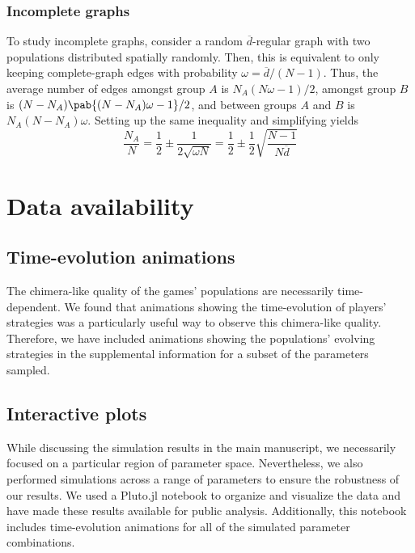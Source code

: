 \subsubsection{Incomplete graphs}\label{sec:two_unequal_groups_incomplete}
To study incomplete graphs,
consider a random $\overline{d}$-regular graph
with two populations distributed spatially randomly.
Then, this is equivalent to only keeping complete-graph edges
with probability $\omega = \overline{d}/(N-1)$.
Thus, the average number of edges
amongst group $A$ is $N_A (N \omega - 1)/2$,
amongst group $B$ is $(N-N_A)\pab{(N-N_A)\omega - 1}/2$,
and between groups $A$ and $B$ is $N_A (N-N_A) \omega$.
Setting up the same inequality and simplifying yields
\begin{equation*}
  \frac{N_A}{N} = \frac{1}{2} \pm \frac{1}{2 \sqrt{\omega N}}
  = \frac{1}{2} \pm \frac{1}{2} \sqrt{\frac{N-1}{N \overline{d}}}
\end{equation*}

\section{Data availability}
\subsection{Time-evolution animations}
The chimera-like quality of the games' populations
are necessarily time-dependent.
We found that animations showing the time-evolution
of players' strategies was a particularly useful way
to observe this chimera-like quality.
Therefore, we have included animations
showing the populations' evolving strategies
in the supplemental information for a subset of the parameters sampled.

\subsection{Interactive plots}
While discussing the simulation results in the main manuscript,
we necessarily focused on a particular region of parameter space.
Nevertheless, we also performed simulations across a range of parameters
to ensure the robustness of our results.
We used a Pluto.jl notebook to organize and visualize the data
and have made these results available for public analysis.
Additionally, this notebook includes time-evolution animations
for all of the simulated parameter combinations.
